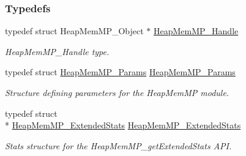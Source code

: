 \subsubsection*{Typedefs}
\begin{DoxyCompactItemize}
\item 
typedef struct Heap\-Mem\-M\-P\-\_\-\-Object $\ast$ \hyperlink{_heap_mem_m_p_8h_a9aa6360e22c2f5f387c5aba52a1a8522}{Heap\-Mem\-M\-P\-\_\-\-Handle}
\begin{DoxyCompactList}\small\item\em Heap\-Mem\-M\-P\-\_\-\-Handle type. \end{DoxyCompactList}\item 
typedef struct \hyperlink{struct_heap_mem_m_p___params}{Heap\-Mem\-M\-P\-\_\-\-Params} \hyperlink{_heap_mem_m_p_8h_a888191d73ac615e5335b1add34db69e8}{Heap\-Mem\-M\-P\-\_\-\-Params}
\begin{DoxyCompactList}\small\item\em Structure defining parameters for the Heap\-Mem\-M\-P module. \end{DoxyCompactList}\item 
typedef struct \\*
\hyperlink{struct_heap_mem_m_p___extended_stats}{Heap\-Mem\-M\-P\-\_\-\-Extended\-Stats} \hyperlink{_heap_mem_m_p_8h_a366cf280eda1086a46528b999b035618}{Heap\-Mem\-M\-P\-\_\-\-Extended\-Stats}
\begin{DoxyCompactList}\small\item\em Stats structure for the Heap\-Mem\-M\-P\-\_\-get\-Extended\-Stats A\-P\-I. \end{DoxyCompactList}\end{DoxyCompactItemize}
